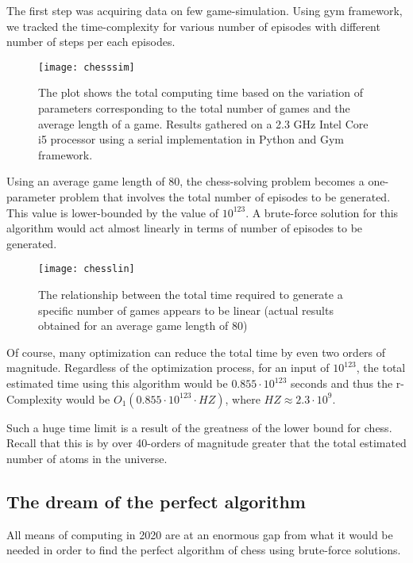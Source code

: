The first step was acquiring data on few game-simulation. Using gym framework, we tracked the time-complexity for various number of episodes with different number of steps per each episodes.

    \begin{figure}[H]
        \centering
        \texttt{[image: chesssim]}
        \caption{The plot shows the total computing time based on the variation of parameters corresponding to the total number of games and the average length of a game. Results gathered on a 2.3 GHz Intel Core i5 processor using a serial implementation in Python and Gym framework. }
    \end{figure}

Using an average game length of 80, the chess-solving problem becomes a one-parameter problem that involves the total number of episodes to be generated. This value is lower-bounded by the value of $10^{123}$. A brute-force solution for this algorithm would act almost linearly in terms of number of episodes to be generated.

    \begin{figure}[H]
        \centering
        \texttt{[image: chesslin]}
        \caption{The relationship between the total time required to generate a specific number of games appears to be linear (actual results obtained for an average game length of 80)}
    \end{figure}
 
Of course, many optimization can reduce the total time by even two orders of magnitude. Regardless of the optimization process, for an input of $10^{123}$, the total estimated time using this algorithm would be $0.855 \cdot 10^{123}$ seconds and thus the r-Complexity would be $O_{1}(0.855 \cdot 10^{123} \cdot HZ)$, where $HZ \approx 2.3 \cdot 10^9$.

Such a huge time limit is a result of the greatness of the lower bound for chess. Recall that this is by over 40-orders of magnitude greater that the total estimated number of atoms in the universe.

\subsection{The dream of the perfect algorithm}
All means of computing in 2020 are at an enormous gap from what it would be needed in order to find the perfect algorithm of chess using brute-force solutions. 


